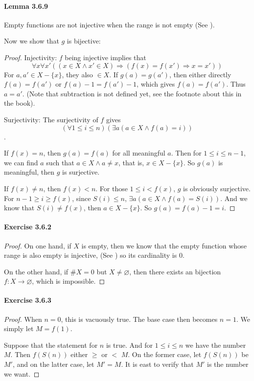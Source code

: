 \paragraph{Lemma 3.6.9}
Empty functions are not injective when the range is not empty (See ). 

Now we show that $g$ is bijective:
\begin{proof}
Injectivity: $f$ being injective implies that 
\[
\forall x \forall x'((x \in X \wedge x' \in X) \Longrightarrow (f(x) = f(x') \Rightarrow x = x'))
\]
For $a,a' \in X - \{x\}$, they also $\in X$. If $g(a) = g(a')$, then either directly $f(a) = f(a')$ or 
$f(a) - 1 = f(a') - 1$, which gives $f(a) = f(a')$. Thus $a = a'$. (Note that subtraction is not defined 
yet, see the footnote about this in the book).

Surjectivity: The surjectivity of $f$ gives 
\[
(\forall 1 \leq i \leq n)(\exists a(a \in X \wedge f(a) = i))
\].

If $f(x) = n$, then $g(a) = f(a)$ for all meaningful $a$. Then for $1 \leq i \leq n-1$, we can find $a$ 
such that $a \in X \wedge a \neq x$, that is, $x \in X - \{x\}$. So $g(a)$ is meaningful, then $g$ is 
surjective.

If $f(x) \neq n$, then $f(x) < n$. For those $1 \leq i < f(x)$, $g$ is obviously surjective. For 
$n-1 \geq i \geq f(x)$, since $S(i) \leq n$, $\exists a(a \in X \wedge f(a) = S(i))$. And we know that 
$S(i) \neq f(x)$, then $a \in X - \{x\}$. So $g(a) = f(a) - 1 = i$.
\end{proof}

\paragraph{Exercise 3.6.2} \label{exercise3.6.2}
\begin{proof}
On one hand, if $X$ is empty, then we know that the empty function whose range is also empty is injective, 
(See ) so its cardinality is $0$. 

On the other hand, if $\# X = 0$ but $X \neq \varnothing$, then there exists an bijection 
$f:X \rightarrow \varnothing$, which is impossible.
\end{proof}

\paragraph{Exercise 3.6.3} \label{exercise3.6.3}
\begin{proof}
When $n = 0$, this is vacuously true. The base case then becomes $n=1$. We simply let $M = f(1)$.

Suppose that the statement for $n$ is true. And for $1\leq i\leq n$ we have the number $M$. Then $f(S(n))$ 
either $\geq$ or $<$ $M$. On the former case, let $f(S(n))$ be $M'$, and on the latter case, let $M' = M$. 
It is east to verify that $M'$ is the number we want.
\end{proof}

